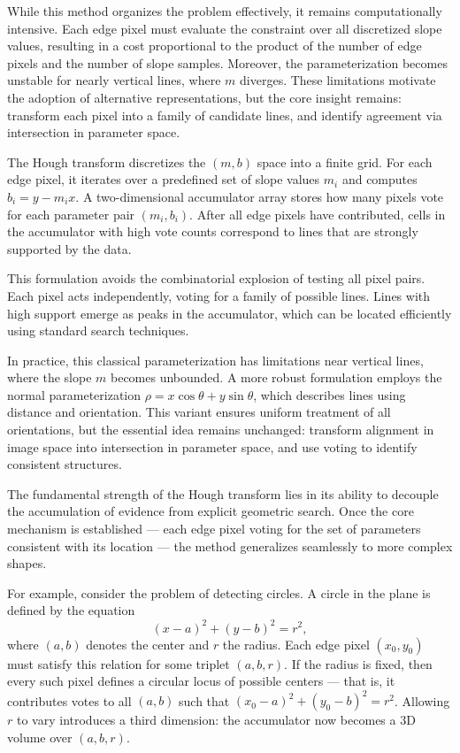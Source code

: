 While this method organizes the problem effectively, it remains computationally intensive. Each edge pixel must evaluate the constraint over all discretized slope values, resulting in a cost proportional to the product of the number of edge pixels and the number of slope samples. Moreover, the parameterization becomes unstable for nearly vertical lines, where $m$ diverges. These limitations motivate the adoption of alternative representations, but the core insight remains: transform each pixel into a family of candidate lines, and identify agreement via intersection in parameter space.

The Hough transform discretizes the $(m, b)$ space into a finite grid. For each edge pixel, it iterates over a predefined set of slope values $m_i$ and computes $b_i = y - m_i x$. A two-dimensional accumulator array stores how many pixels vote for each parameter pair $(m_i, b_i)$. After all edge pixels have contributed, cells in the accumulator with high vote counts correspond to lines that are strongly supported by the data.

This formulation avoids the combinatorial explosion of testing all pixel pairs. Each pixel acts independently, voting for a family of possible lines. Lines with high support emerge as peaks in the accumulator, which can be located efficiently using standard search techniques.

In practice, this classical parameterization has limitations near vertical lines, where the slope $m$ becomes unbounded. A more robust formulation employs the normal parameterization $\rho = x\cos\theta + y\sin\theta$, which describes lines using distance and orientation. This variant ensures uniform treatment of all orientations, but the essential idea remains unchanged: transform alignment in image space into intersection in parameter space, and use voting to identify consistent structures.

The fundamental strength of the Hough transform lies in its ability to decouple the accumulation of evidence from explicit geometric search. Once the core mechanism is established — each edge pixel voting for the set of parameters consistent with its location — the method generalizes seamlessly to more complex shapes.

For example, consider the problem of detecting circles. A circle in the plane is defined by the equation
\[
(x - a)^2 + (y - b)^2 = r^2,
\]
where $(a, b)$ denotes the center and $r$ the radius. Each edge pixel $(x_0, y_0)$ must satisfy this relation for some triplet $(a, b, r)$. If the radius is fixed, then every such pixel defines a circular locus of possible centers — that is, it contributes votes to all $(a, b)$ such that $(x_0 - a)^2 + (y_0 - b)^2 = r^2$. Allowing $r$ to vary introduces a third dimension: the accumulator now becomes a 3D volume over $(a, b, r)$.

